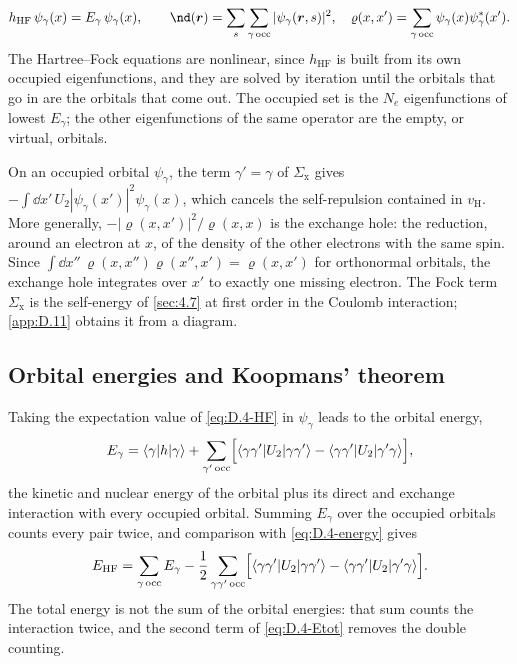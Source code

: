 \begin{equation}
  h_{\mathrm{HF}}\,\psi_\gamma(x) = E_\gamma\,\psi_\gamma(x), \qquad
  \nd(\vect{r}) = \sum_s\sum_{\gamma\,\mathrm{occ}}|\psi_\gamma(\vect{r}, s)|^2, \quad
  \varrho(x, x') = \sum_{\gamma\,\mathrm{occ}}\psi_\gamma(x)\psi^*_\gamma(x') .
  \label{eq:D.4-HF}
\end{equation}
The Hartree--Fock equations are nonlinear, since $h_{\mathrm{HF}}$ is built from its own occupied eigenfunctions, and they are solved by iteration until the orbitals that go in are the orbitals that come out. The occupied set is the $N_e$ eigenfunctions of lowest $E_\gamma$; the other eigenfunctions of the same operator are the empty, or virtual, orbitals.

On an occupied orbital $\psi_\gamma$, the term $\gamma' = \gamma$ of $\Sigma_{\mathrm{x}}$ gives $-\int\dd x'\,U_2|\psi_\gamma(x')|^2\psi_\gamma(x)$, which cancels the self-repulsion contained in $v_{\mathrm{H}}$. More generally, $-|\varrho(x, x')|^2/\varrho(x, x)$ is the exchange hole: the reduction, around an electron at $x$, of the density of the other electrons with the same spin. Since $\int\dd x''\,\varrho(x, x'')\varrho(x'', x') = \varrho(x, x')$ for orthonormal orbitals, the exchange hole integrates over $x'$ to exactly one missing electron. The Fock term $\Sigma_{\mathrm{x}}$ is the self-energy of \cref{sec:4.7} at first order in the Coulomb interaction; \cref{app:D.11} obtains it from a diagram.

\subsection{Orbital energies and Koopmans' theorem}

Taking the expectation value of \cref{eq:D.4-HF} in $\psi_\gamma$ leads to the orbital energy,
\begin{equation*}
  E_\gamma = \langle\gamma|h|\gamma\rangle + \sum_{\gamma'\,\mathrm{occ}}\Bigl[\langle\gamma\gamma'|U_2|\gamma\gamma'\rangle - \langle\gamma\gamma'|U_2|\gamma'\gamma\rangle\Bigr] ,
\end{equation*}
the kinetic and nuclear energy of the orbital plus its direct and exchange interaction with every occupied orbital. Summing $E_\gamma$ over the occupied orbitals counts every pair twice, and comparison with \cref{eq:D.4-energy} gives
\begin{equation}
  E_{\mathrm{HF}} = \sum_{\gamma\,\mathrm{occ}}E_\gamma - \frac12\sum_{\gamma\gamma'\,\mathrm{occ}}\Bigl[\langle\gamma\gamma'|U_2|\gamma\gamma'\rangle - \langle\gamma\gamma'|U_2|\gamma'\gamma\rangle\Bigr] .
  \label{eq:D.4-Etot}
\end{equation}
The total energy is not the sum of the orbital energies: that sum counts the interaction twice, and the second term of \cref{eq:D.4-Etot} removes the double counting.


